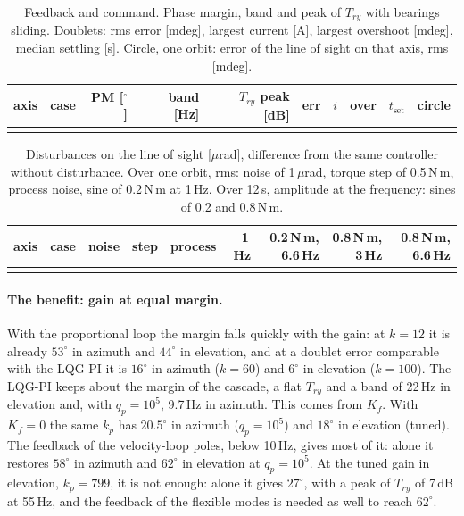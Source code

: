 \documentclass[10pt,a4paper]{article}
\numberwithin{equation}{section}
\begin{document}
\begin{table}[H]\centering\footnotesize\setlength{\tabcolsep}{4pt}
\caption{Feedback and command. Phase margin, band and peak of $T_{ry}$ with bearings sliding. Doublets: rms error [mdeg], largest current [A], largest overshoot [mdeg], median settling [s]. Circle, one orbit: error of the line of sight on that axis, rms [mdeg].}\label{tab:benefitscmd}
\begin{tabular}{llrrrrrrrr}\toprule
axis & case & PM [$^\circ$] & band [Hz] & $T_{ry}$ peak [dB] & err & $i$ & over & $t_\mathrm{set}$ & circle \\ \midrule
\\ \bottomrule
\end{tabular}\end{table}

\begin{table}[H]\centering\footnotesize\setlength{\tabcolsep}{4pt}
\caption{Disturbances on the line of sight [$\mu$rad], difference from the same controller without disturbance. Over one orbit, rms: noise of 1\,$\mu$rad, torque step of 0.5\,N\,m, process noise, sine of 0.2\,N\,m at 1\,Hz. Over 12\,s, amplitude at the frequency: sines of 0.2 and 0.8\,N\,m.}\label{tab:benefitsdist}
\begin{tabular}{llrrrrrrr}\toprule
axis & case & noise & step & process & 1\,Hz & 0.2\,N\,m, 6.6\,Hz & 0.8\,N\,m, 3\,Hz & 0.8\,N\,m, 6.6\,Hz \\ \midrule
\\ \bottomrule
\end{tabular}\end{table}

\paragraph{The benefit: gain at equal margin.} With the proportional loop the margin falls quickly with the gain: at $k=12$ it is already $53^\circ$ in azimuth and $44^\circ$ in elevation, and at a doublet error comparable with the LQG-PI it is $16^\circ$ in azimuth ($k=60$) and $6^\circ$ in elevation ($k=100$). The LQG-PI keeps about the margin of the cascade, a flat $T_{ry}$ and a band of 22\,Hz in elevation and, with $q_p=10^5$, 9.7\,Hz in azimuth. This comes from $K_f$. With $K_f=0$ the same $k_p$ has $20.5^\circ$ in azimuth ($q_p=10^5$) and $18^\circ$ in elevation (tuned). The feedback of the velocity-loop poles, below 10\,Hz, gives most of it: alone it restores $58^\circ$ in azimuth and $62^\circ$ in elevation at $q_p=10^5$. At the tuned gain in elevation, $k_p=799$, it is not enough: alone it gives $27^\circ$, with a peak of $T_{ry}$ of 7\,dB at 55\,Hz, and the feedback of the flexible modes is needed as well to reach $62^\circ$.
\end{document}
